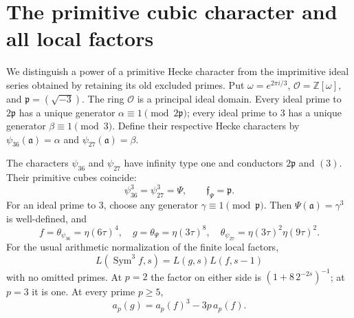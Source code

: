 \section{The primitive cubic character and all local factors}
We distinguish a power of a primitive Hecke character from the
imprimitive ideal series obtained by retaining its old excluded primes.
Put $\omega=e^{2\pi i/3}$, $\mathcal O=\mathbb Z[\omega]$, and
$\mathfrak p=(\sqrt{-3})$. The ring $\mathcal O$ is a principal ideal
domain. Every ideal prime to $2\mathfrak p$ has a unique generator
$\alpha\equiv1\pmod{2\mathfrak p}$; every ideal prime to $3$ has a
unique generator $\beta\equiv1\pmod3$. Define their respective
Hecke characters by $\psi_{36}(\mathfrak a)=\alpha$ and
$\psi_{27}(\mathfrak a)=\beta$.

\begin{theorem}\label{thm:primitive-cube}
The characters $\psi_{36}$ and $\psi_{27}$ have infinity type one
and conductors $2\mathfrak p$ and $(3)$. Their primitive cubes coincide:
\[
 \psi_{36}^3=\psi_{27}^3=\Psi,
 \qquad \mathfrak f_\Psi=\mathfrak p.
\]
For an ideal prime to $3$, choose any generator
$\gamma\equiv1\pmod{\mathfrak p}$. Then
$\Psi(\mathfrak a)=\gamma^3$ is well-defined, and
\[
 f=\theta_{\psi_{36}}=\eta(6\tau)^4,
 \quad g=\theta_\Psi=\eta(3\tau)^8,
 \quad \theta_{\psi_{27}}=\eta(3\tau)^2\eta(9\tau)^2.
\]
For the usual arithmetic normalization of the finite local factors,
\begin{equation}\label{eq:full-cube}
 L(\operatorname{Sym}^3f,s)=L(g,s)L(f,s-1)
\end{equation}
with no omitted primes. At $p=2$ the factor on either side is
$(1+8\,2^{-2s})^{-1}$; at $p=3$ it is one. At every prime $p\ge5$,
\[
 a_p(g)=a_p(f)^3-3p\,a_p(f).
\]
\end{theorem}
